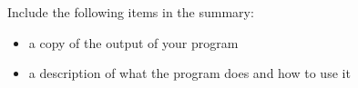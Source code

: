 \documentclass[12pt]{article}
\begin{document}
\begin{description}[labelindent=1cm]
Include the following items in the summary:
\begin{itemize}

\item a copy of the output of your program
\item a description of what the program does and how to use it

\end{itemize}


%
%
%
%
%


\end{description}
\end{document}
